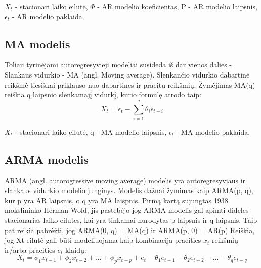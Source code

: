 \documentclass{VUMIFInfKursinis}
\begin{document}
${X_t}$ - stacionari laiko eilutė, $\Phi$ - AR modelio koeficientas, P - AR modelio laipsnis, $ \epsilon_{t} $ - AR modelio paklaida.

\subsection {MA modelis}
Toliau tyrinėjami autoregresyvieji modeliai susideda iš dar vienos dalies - Slankaus vidurkio - MA (angl. Moving average). Slenkančio vidurkio dabartinė
reikšmė tiesiškai priklauso nuo dabartines ir praeitų reikšmių. Žymėjimas MA(q) reiškia q laipsnio slenkamajį vidurkį, kurio formulę atrodo taip:  
\[X_{t} = \epsilon_{t} - \sum_{i=1}^{q}\theta_{i}  \epsilon_{t-i}\]

${X_t}$ - stacionari laiko eilutė, q - MA modelio laipsnis, ${\epsilon_t}$ - MA modelio paklaida.

\subsection {ARMA modelis}
ARMA (angl. autorogressive moving average) modelis yra autoregresyviaus ir slankaus vidurkio modelio junginys. Modelis dažnai žymimas
kaip ARMA(p, q), kur p yra AR laipsnis, o q yra MA laispnis. Pirmą kartą sujungtas 1938 mokslininko Herman Wold, jis pastebėjo jog ARMA modelis gal apimti 
dideles stacionarias laiko eilutes, kai yra tinkamai nurodytas p laipsnis ir q laipsnis\cite{makridakis1997arma}. Taip pat reikia pabrėžti, 
jog ARMA(0, q) = MA(q) ir ARMA(p, 0) = AR(p) Reiškia, jog Xt eilutė gali būti modeliuojama kaip kombinacija praeities $x_{t}$ reikšmių ir/arba praeities $e_{t}$ klaidų:
\[X_{t} = \phi_{1}x_{t-1} + \phi_{2}x_{t-2} + ... + \phi_{p}x_{t-p} + e_{t} - \theta_{1}e_{t-1} - \theta_{2}e_{t-2} - ... - \theta_{q}e_{t-q}\]
\end{document}
